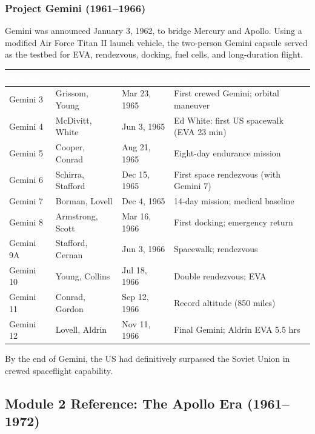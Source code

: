 \documentclass[11pt,letterpaper]{article}
\newcommand{\tableheader}[1]{\textbf{\sffamily\textcolor{white}{#1}}}
\begin{document}
\subsubsection{Project Gemini (1961--1966)}

Gemini was announced January 3, 1962, to bridge Mercury and Apollo. Using a modified Air Force Titan II launch vehicle, the two-person Gemini capsule served as the testbed for EVA, rendezvous, docking, fuel cells, and long-duration flight.

\begin{center}
\begin{tabularx}{\textwidth}{L{2cm}L{3cm}L{1.8cm}X}
\toprule
{}
\tableheader{Mission} & \tableheader{Crew} & \tableheader{Launch} & \tableheader{Key Achievement} \\
\midrule
Gemini 3 & Grissom, Young & Mar 23, 1965 & First crewed Gemini; orbital maneuver \\
Gemini 4 & McDivitt, White & Jun 3, 1965 & Ed White: first US spacewalk (EVA 23 min) \\
Gemini 5 & Cooper, Conrad & Aug 21, 1965 & Eight-day endurance mission \\
Gemini 6 & Schirra, Stafford & Dec 15, 1965 & First space rendezvous (with Gemini 7) \\
Gemini 7 & Borman, Lovell & Dec 4, 1965 & 14-day mission; medical baseline \\
Gemini 8 & Armstrong, Scott & Mar 16, 1966 & First docking; emergency return \\
Gemini 9A & Stafford, Cernan & Jun 3, 1966 & Spacewalk; rendezvous \\
Gemini 10 & Young, Collins & Jul 18, 1966 & Double rendezvous; EVA \\
Gemini 11 & Conrad, Gordon & Sep 12, 1966 & Record altitude (850 miles) \\
Gemini 12 & Lovell, Aldrin & Nov 11, 1966 & Final Gemini; Aldrin EVA 5.5 hrs \\
\bottomrule
\end{tabularx}
\end{center}

By the end of Gemini, the US had definitively surpassed the Soviet Union in crewed spaceflight capability.

\subsection{Module 2 Reference: The Apollo Era (1961--1972)}
\end{document}
